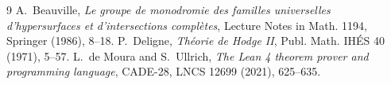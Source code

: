 \documentclass[11pt]{amsart}
\theoremstyle{definition}
\theoremstyle{remark}
\begin{document}
\begin{thebibliography}{9}
 A.~Beauville, \emph{Le groupe de monodromie des familles universelles d'hypersurfaces et d'intersections compl\`etes}, Lecture Notes in Math. 1194, Springer (1986), 8--18.
 P.~Deligne, \emph{Th\'eorie de Hodge II}, Publ. Math. IH\'ES 40 (1971), 5--57.
 L.~de Moura and S.~Ullrich, \emph{The Lean 4 theorem prover and programming language}, CADE-28, LNCS 12699 (2021), 625--635.
\end{thebibliography}
\end{document}
